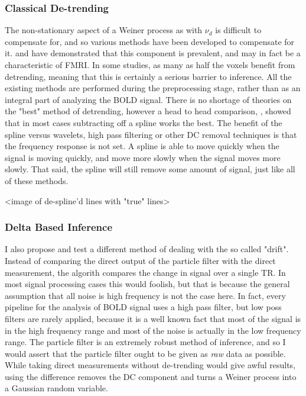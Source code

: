 \documentclass{article}
\begin{document}
\subsubsection{Classical De-trending}
The non-stationary
aspect of a Weiner process as with $\nu_d$ is difficult to compensate for, and so various methods
have been developed to compensate for it. \cite{detrend} and \cite{drift} have
demonstrated that this component is prevalent, and may in fact be a characteristic
of FMRI. In some studies, as many as half the voxels benefit from detrending, meaning
that this is certainly a serious barrier to inference. All the existing methods are performed
during the preprocessing stage, rather than as an integral part of analyzing the BOLD
signal. There is no shortage of theories on the "best" method of detrending, however
a head to head comparison, \cite{detrend}, showed that in most cases subtracting off
a spline works the best. The benefit of the spline versus wavelets, high pass 
filtering or other DC removal techniques is that the frequency response is not set.
A spline is able to move quickly when the signal is moving quickly, and move more
slowly when the signal moves more slowly. That said, the spline will still remove some
amount of signal, just like all of these methods. 

<image of de-spline'd lines with "true" lines>

\subsubsection{Delta Based Inference}
I also propose and test a different method of dealing with the so called "drift". 
Instead of comparing the direct output of the particle filter with the direct
measurement, the algorith compares the change in signal over a single TR. 
In most signal processing cases this would foolish, but that is because the 
general assumption that all noise is high frequency is not the case here.
In fact, every pipeline for the analysis of BOLD signal uses a high pass filter,
but low poss filters are rarely applied, because it is a well known fact that 
most of the signal is in the high frequency range and most of the noise is actually 
in the low frequency range. The particle filter is an 
extremely robust method of inference, and so I would assert that the particle
filter ought to be given as \emph{raw} data as possible. While taking direct measurements
without de-trending would give awful results, using the difference removes the 
DC component and turns a Weiner process into a Gaussian random variable. 
\end{document}
